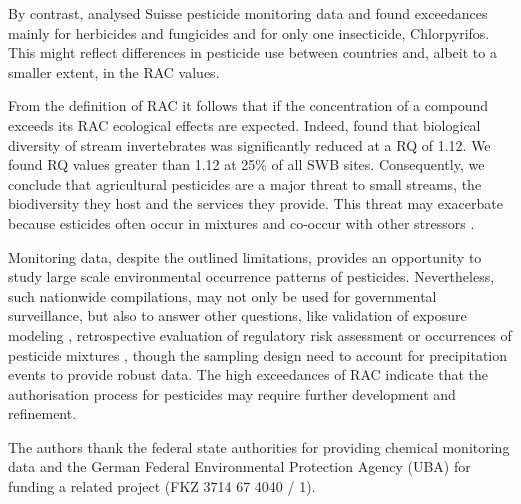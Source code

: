 \documentclass[journal=esthag,manuscript=article]{achemso}
\begin{document}
By contrast, \citet{knauer_pesticides_2016} analysed Suisse pesticide monitoring data and found exceedances mainly for herbicides and fungicides and for only one insecticide, Chlorpyrifos.
This might reflect differences in pesticide use between countries and, albeit to a smaller extent, in the RAC values.

From the definition of RAC it follows that if the concentration of a compound exceeds its RAC ecological effects are expected.
Indeed, \citet{stehle_agricultural_2015} found that biological diversity of stream invertebrates was significantly reduced at a RQ of 1.12.
We found RQ values greater than 1.12 at 25\% of all SWB sites. 
Consequently, we conclude that agricultural pesticides are a major threat to small streams, the biodiversity they host and the services they provide. 
This threat may exacerbate because esticides often occur in mixtures \cite{schreiner_pesticide_2016} and co-occur with other stressors \citep{schafer_contribution_2016}.

Monitoring data, despite the outlined limitations, provides an opportunity to study large scale environmental occurrence patterns of pesticides.
Nevertheless, such nationwide compilations, may not only be used for governmental surveillance, but also to answer other questions, like validation of exposure modeling \cite{knabel_fungicide_2014}, retrospective evaluation of regulatory risk assessment \citep{knauer_pesticides_2016,stehle_pesticide_2015}or occurrences of pesticide mixtures \cite{schreiner_pesticide_2016}, though the sampling design need to account for precipitation events to provide robust data. 
The high exceedances of RAC indicate that the authorisation process for pesticides may require further development and refinement.




\begin{acknowledgement}
The authors thank the federal state authorities for providing chemical monitoring data and the German Federal Environmental Protection Agency (UBA) for funding a related project (FKZ 3714 67 4040 / 1). 
\end{acknowledgement}
\end{document}
